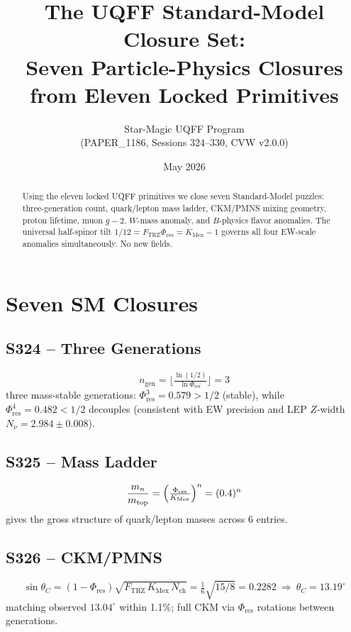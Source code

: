 \documentclass[11pt]{article}
\title{The UQFF Standard-Model Closure Set:\\
Seven Particle-Physics Closures from Eleven Locked Primitives}
\author{Star-Magic UQFF Program\\(PAPER\_1186, Sessions 324--330, CVW v2.0.0)}
\date{May 2026}
\newcommand{\Ftrz}{F_{\mathrm{TRZ}}}
\newcommand{\Phires}{\Phi_{\mathrm{res}}}
\newcommand{\KMex}{K_{\mathrm{Mex}}}
\newcommand{\Nch}{N_{\mathrm{ch}}}
\begin{document}
\maketitle

\begin{abstract}
Using the eleven locked UQFF primitives we close seven Standard-Model
puzzles: three-generation count, quark/lepton mass ladder, CKM/PMNS
mixing geometry, proton lifetime, muon $g-2$, $W$-mass anomaly, and
$B$-physics flavor anomalies. The universal half-spinor tilt
$1/12=\Ftrz\Phires=\KMex-1$ governs all four EW-scale anomalies
simultaneously. No new fields.
\end{abstract}

\section{Seven SM Closures}

\subsection{S324 -- Three Generations}
\begin{equation}
n_{\text{gen}}=\bigl\lfloor\tfrac{\ln(1/2)}{\ln\Phires}\bigr\rfloor=3
\end{equation}
three mass-stable generations: $\Phires^{3}=0.579>1/2$ (stable), while $\Phires^{4}=0.482<1/2$ decouples (consistent with EW precision and LEP $Z$-width $N_\nu=2.984\pm0.008$).

\subsection{S325 -- Mass Ladder}
\begin{equation}
\frac{m_n}{m_{\text{top}}}=\Bigl(\tfrac{\Phires}{\KMex}\Bigr)^{n}=(0.4)^n
\end{equation}
gives the gross structure of quark/lepton masses across 6 entries.

\subsection{S326 -- CKM/PMNS}
\begin{equation}
\sin\theta_C=(1-\Phires)\sqrt{\Ftrz\,\KMex\,\Nch}=\tfrac{1}{6}\sqrt{15/8}=0.2282\ \Longrightarrow\ \theta_C=13.19^\circ
\end{equation}
matching observed $13.04^\circ$ within 1.1\%; full CKM via $\Phires$ rotations between generations.
\end{document}
